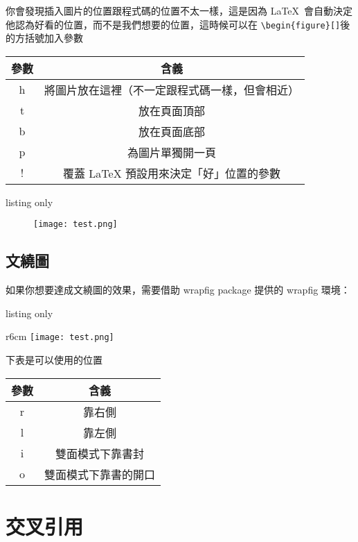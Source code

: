 你會發現插入圖片的位置跟程式碼的位置不太一樣，這是因為 \LaTeX\ 會自動決定他認為好看的位置，而不是我們想要的位置，這時候可以在 \verb|\begin{figure}[]|後的方括號加入參數

\begin{tabular}{cc}
參數  & 含義 \\\hline\hline
 h  & 將圖片放在這裡（不一定跟程式碼一樣，但會相近） \\\hline
 t  & 放在頁面頂部 \\\hline
 b  & 放在頁面底部 \\\hline
 p  & 為圖片單獨開一頁 \\\hline
 !  & 覆蓋 LaTeX 預設用來決定「好」位置的參數 \\\hline
\end{tabular}

\begin{tcblisting}{listing only}
\begin{figure}[h]
\texttt{[image: test.png]}
\end{figure}
\end{tcblisting}

\subsection{文繞圖}

如果你想要達成文繞圖的效果，需要借助 wrapfig package 提供的 wrapfig 環境：

\begin{tcblisting}{listing only}
\begin{wrapfigure}{r}{6cm}
\texttt{[image: test.png]}
\end{wrapfigure}
\end{tcblisting}

下表是可以使用的位置

\begin{tabular}{cc}
\hline
參數 & 含義 \\\hline\hline
 r  & 靠右側 \\\hline
 l  & 靠左側 \\\hline
 i  & 雙面模式下靠書封 \\\hline
 o  & 雙面模式下靠書的開口 \\\hline
\end{tabular}

\section{交叉引用}

